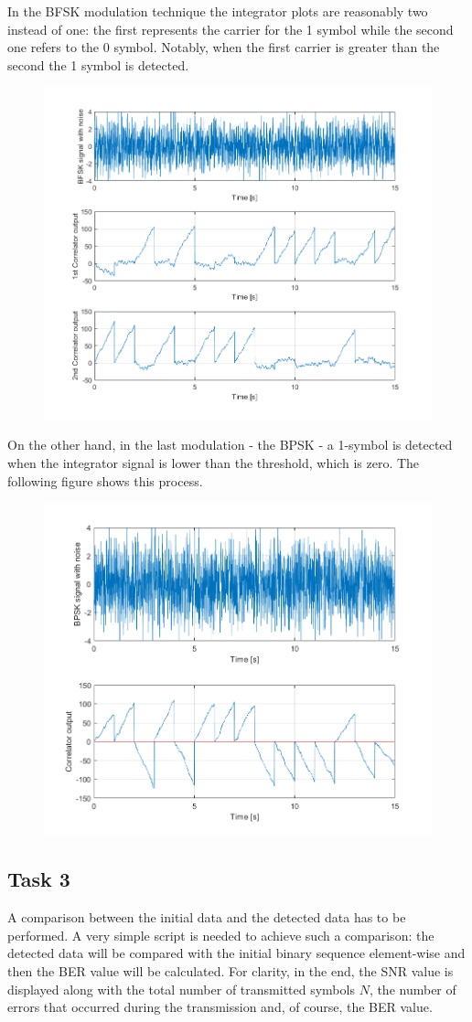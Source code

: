 \FloatBarrier\noindent In the BFSK modulation technique the integrator plots are reasonably two instead of one: the first represents the carrier for the 1 symbol while the second one refers to the 0 symbol. Notably, when the first carrier is greater than the second the 1 symbol is detected.
\begin{figure}[h!]
    \centering
    \includegraphics[width = .7\textwidth]{lab-4/imgs/BFSK.png}
\end{figure}

\FloatBarrier\noindent On the other hand, in the last modulation - the BPSK - a 1-symbol is detected when the integrator signal is lower than the threshold, which is zero. The following figure shows this process.

\begin{figure}[h!]
    \centering
    \includegraphics[width = .7\textwidth]{lab-4/imgs/BPSK.png}
\end{figure}


\FloatBarrier

\subsection*{Task 3}
A comparison between the initial data and the detected data has to be performed. A very simple script is needed to achieve such a comparison: the detected data will be compared with the initial binary sequence element-wise and then the BER value will be calculated. For clarity, in the end, the SNR value is displayed along with the total number of transmitted symbols $N$, the number of errors that occurred during the transmission and, of course, the BER value.

